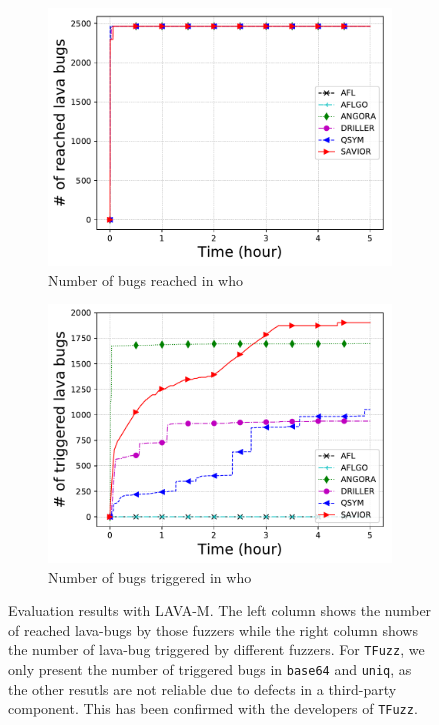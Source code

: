 \begin{figure}[htb]
\begin{subfigure}[b]{0.24\textwidth}
        \label{fig:eval:lava:md5sum}
    \end{subfigure}\\
    \begin{subfigure}[b]{0.24\textwidth}
        \centering
        \includegraphics[width=1\textwidth]{savior/figures/lava_who_bugcov.pdf}
        \caption{\scriptsize{Number of bugs reached in who}}
        \label{fig:eval:lava:who}
    \end{subfigure}
    \begin{subfigure}[b]{0.24\textwidth}
        \centering
        \includegraphics[width=1\textwidth]{savior/figures/lava_who.pdf}
        \caption{\scriptsize{Number of bugs triggered in who}}
        \label{fig:eval:lava:md5sum}
    \end{subfigure}
    \caption{Evaluation results with LAVA-M. The left column shows the number of reached lava-bugs by those fuzzers while the right column shows the number of lava-bug triggered by different fuzzers. For {\tt TFuzz}, we only present the number of triggered bugs in {\tt base64} and {\tt uniq}, as the other resutls are not reliable due to defects in a third-party component. This has been confirmed with the developers of {\tt TFuzz}.}
    \label{fig:lava_cfa}
\end{figure}





